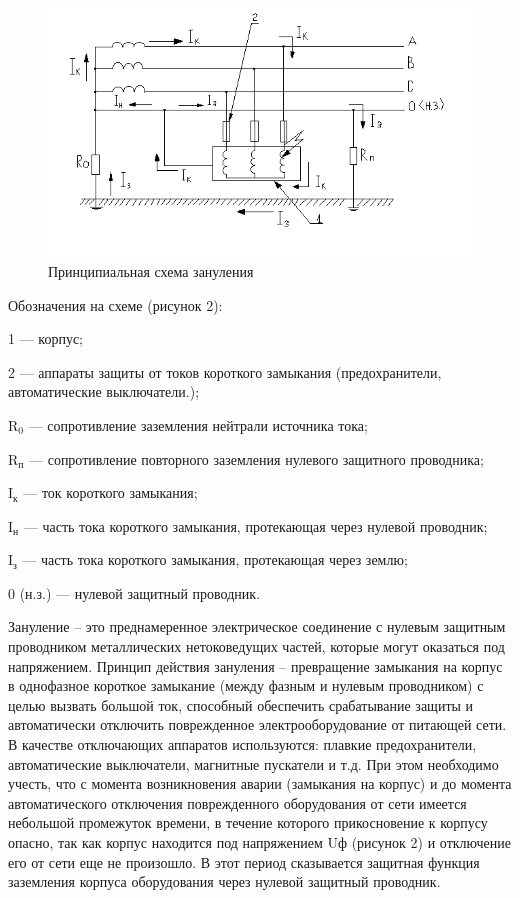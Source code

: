 \begin{figure}
  	\label{ot-zanul}
  	\centering
  	\includegraphics[width=1\textwidth]{images/ot-zanul.png}
  	\caption{Принципиальная схема зануления}
\end{figure}

Обозначения на схеме (рисунок 2):

1 --- корпус;

2 --- аппараты защиты от токов короткого замыкания (предохранители, автоматические выключатели.);

\( \text{R}_{\text{0}} \) --- сопротивление заземления нейтрали источника тока;

\( \text{R}_{\text{п}} \) --- сопротивление повторного заземления нулевого защитного проводника;

\( \text{I}_{\text{к}} \) --- ток короткого замыкания;

\( \text{I}_{\text{н}} \) --- часть тока короткого замыкания, протекающая через нулевой проводник;

\( \text{I}_{\text{з}} \) --- часть тока короткого замыкания, протекающая через землю;

0 (н.з.) --- нулевой защитный проводник.

Зануление – это преднамеренное электрическое соединение с нулевым защитным проводником металлических нетоковедущих частей, которые могут оказаться под напряжением.
Принцип действия зануления – превращение замыкания на корпус в однофазное короткое замыкание (между фазным и нулевым проводником) с целью вызвать большой ток, способный обеспечить срабатывание защиты и автоматически отключить поврежденное электрооборудование от питающей сети. В качестве отключающих аппаратов используются: плавкие предохранители, автоматические выключатели, магнитные пускатели и т.д. При этом необходимо учесть, что с момента возникновения аварии (замыкания на корпус) и до момента автоматического отключения поврежденного оборудования от сети имеется небольшой промежуток времени, в течение которого прикосновение к корпусу опасно, так как корпус находится под напряжением Uф  (рисунок 2)  и отключение его от сети еще не произошло. В этот период сказывается защитная функция заземления корпуса оборудования через нулевой защитный проводник.

